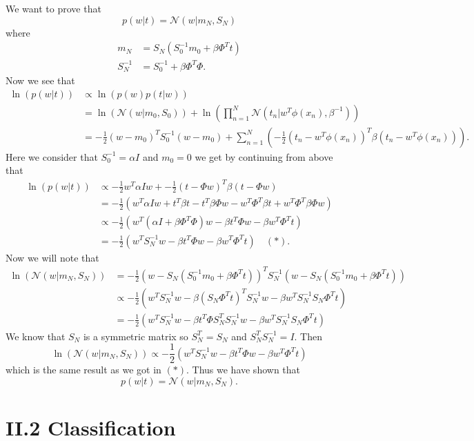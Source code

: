 \documentclass[a4paper,10pt]{article}
\begin{document}
We want to prove that 
$$p(w|t) = \mathcal{N}(w|m_N,S_N)$$
where
\begin{align*}
m_N &= S_N(S_0^{-1}m_0 + \beta \Phi^Tt) \\
S_N^{-1} &= S_0^{-1} + \beta \Phi^T \Phi.
\end{align*}
Now we see that
\begin{align*}
\ln(p(w|t)) &\propto \ln(p(w)p(t|w)) \\
		&= \ln(\mathcal{N}(w|m_0,S_0)) + \ln\left(\prod_{n=1}^N \mathcal{N}(t_n|w^T\phi(x_n),\beta^{-1})\right) \\
		&= -\frac{1}{2}(w-m_0)^T S_0^{-1} (w-m_0) + \sum_{n=1}^N \left( -\frac{1}{2}(t_n-w^T\phi(x_n))^T \beta (t_n-w^T\phi(x_n)) \right).
\end{align*}
Here we consider that $S_0^{-1} = \alpha I$ and $m_0 = 0$ we get by continuing from above that
\begin{align*}
\ln(p(w|t)) &\propto -\frac{1}{2}w^T \alpha I w + -\frac{1}{2}(t-\Phi w)^T \beta (t-\Phi w) \\
		&= -\frac{1}{2}\left( w^T \alpha I w + t^T\beta t - t^T \beta \Phi w - w^T\Phi^T \beta t + w^T \Phi^T \beta \Phi w \right) \\
		&\propto -\frac{1}{2}\left( w^T (\alpha I + \beta \Phi^T \Phi) w - \beta t^T  \Phi w - \beta w^T\Phi^T t \right) \\
		&= -\frac{1}{2}\left( w^T S_N^{-1} w - \beta t^T  \Phi w - \beta w^T\Phi^T t \right) \quad (\ast).
\end{align*}
Now we will note that 
\begin{align*}
\ln(\mathcal{N}(w|m_N,S_N)) &= -\frac{1}{2} (w - S_N(S_0^{-1}m_0 + \beta \Phi^Tt))^T S_N^{-1}(w - S_N(S_0^{-1}m_0 + \beta \Phi^Tt)) \\
		&\propto -\frac{1}{2}\left( w^T S_N^{-1} w - \beta (S_N\Phi^T t)^T S_N^{-1} w - \beta w^T S_N^{-1} S_N \Phi^T t \right) \\
		&= -\frac{1}{2}\left( w^T S_N^{-1} w - \beta t^T \Phi S_N^T S_N^{-1} w - \beta w^T S_N^{-1} S_N \Phi^T t \right)
\end{align*}
We know that $S_N$ is a symmetric matrix so $S_N^T = S_N$ and $S_N^T S_N^{-1} = I$. Then
$$\ln(\mathcal{N}(w|m_N,S_N)) \propto -\frac{1}{2}\left( w^T S_N^{-1} w - \beta t^T \Phi w - \beta w^T \Phi^T t \right)$$
which is the same result as we got in $(\ast)$. Thus we have shown that
$$p(w|t) = \mathcal{N}(w|m_N,S_N).$$


\section*{II.2 Classification}
\end{document}
